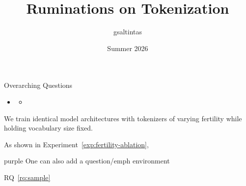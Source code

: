 \documentclass{article}
\title{Ruminations on Tokenization}
\author{gsaltintas}
\date{Summer 2026}
\begin{document}
\maketitle

\tableofcontents

\begin{emphbox}{Overarching Questions}
    \begin{itemize}
        \item 
        \begin{itemize}
            \item 
        \end{itemize}
    \end{itemize}
\end{emphbox}

\begin{experimentbox}[label=exp:fertility-ablation,title={Experiment \thetcbcounter:  \textit{Title for the Experiment}}]
We train identical model architectures with tokenizers of varying fertility while holding vocabulary size fixed.
\end{experimentbox}

As shown in Experiment~\ref{exp:fertility-ablation}, 

\begin{question}[right]{purple}
    \label{rq:sample}
    One can also add a question/emph environment
\end{question}

RQ~\ref{rq:sample}

\clearpage


\end{document}
